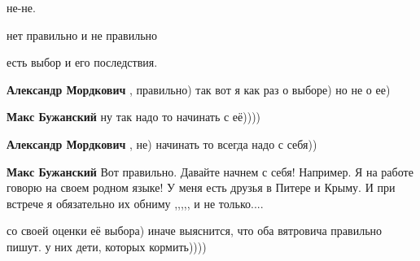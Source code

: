 \begin{itemize}
 

не-не.

нет правильно и не правильно

есть выбор и его последствия.

\begin{itemize}
 
\textbf{Александр Мордкович} , правильно) так вот я как раз о выборе) но не о ее)

 
\textbf{Макс Бужанский} ну так надо то начинать с её))))

 
\textbf{Александр Мордкович} , не) начинать то всегда надо с себя))

 
\textbf{Макс Бужанский} Вот правильно. Давайте начнем с себя! Например. Я на
работе говорю на своем родном языке! У меня есть друзья в Питере и Крыму. И при
встрече я обязательно их обниму ,,,,, и не только....

 
со своей оценки её выбора)
иначе выяснится, что оба вятровича правильно пишут. у них дети, которых кормить))))


\end{itemize}
\end{itemize}
